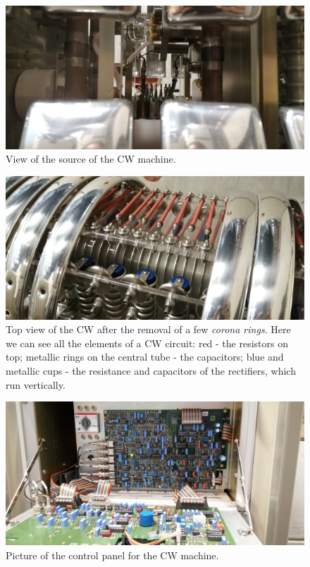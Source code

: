 \begin{refsection}
        \begin{figure}
            \centering
            \includegraphics[width=1\textwidth]{Figures/MEG/CW/view_source.jpg}
            \caption{View of the source of the CW   machine.}
            \label{fig:CW:view_source}
        \end{figure}

        \begin{figure}
            \centering
            \includegraphics[width=1\textwidth]{Figures/MEG/CW/view_top.jpg}
            \caption{Top view of the CW after the removal of a few \textit{corona rings}. Here we can see all the elements of a CW circuit: red - the resistors on top; metallic rings on the central tube - the capacitors; blue and metallic cups - the resistance and capacitors of the rectifiers, which run vertically.}
            \label{fig:CW:view_top}
        \end{figure}

        \begin{figure}
            \centering
            \includegraphics[width=1\textwidth]{Figures/MEG/CW/panel.jpg}
            \caption{Picture of the control panel for the CW machine.}
            \label{fig:CW:panel}
        \end{figure}


\end{refsection}
